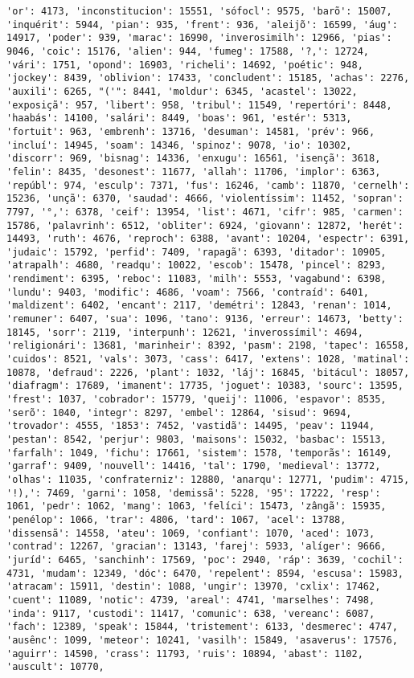 \documentclass[11pt]{article}
\begin{document}
\begin{Verbatim}[commandchars=\\\{\}]
'or': 4173, 'inconstitucion': 15551, 'sófocl': 9575, 'barõ': 15007, 'inquérit': 5944, 'pian': 935, 'frent': 936, 'aleijõ': 16599, 'áug': 14917, 'poder': 939, 'marac': 16990, 'inverosimilh': 12966, 'pias': 9046, 'coic': 15176, 'alien': 944, 'fumeg': 17588, '?,': 12724, 'vári': 1751, 'opond': 16903, 'richeli': 14692, 'poétic': 948, 'jockey': 8439, 'oblivion': 17433, 'concludent': 15185, 'achas': 2276, 'auxili': 6265, "('": 8441, 'moldur': 6345, 'acastel': 13022, 'exposiçã': 957, 'libert': 958, 'tribul': 11549, 'repertóri': 8448, 'haabás': 14100, 'salári': 8449, 'boas': 961, 'estér': 5313, 'fortuit': 963, 'embrenh': 13716, 'desuman': 14581, 'prév': 966, 'incluí': 14945, 'soam': 14346, 'spinoz': 9078, 'io': 10302, 'discorr': 969, 'bisnag': 14336, 'enxugu': 16561, 'isençã': 3618, 'felin': 8435, 'desonest': 11677, 'allah': 11706, 'implor': 6363, 'repúbl': 974, 'esculp': 7371, 'fus': 16246, 'camb': 11870, 'cernelh': 15236, 'unçã': 6370, 'saudad': 4666, 'violentíssim': 11452, 'sopran': 7797, '°,': 6378, 'ceif': 13954, 'list': 4671, 'cifr': 985, 'carmen': 15786, 'palavrinh': 6512, 'obliter': 6924, 'giovann': 12872, 'herét': 14493, 'ruth': 4676, 'reproch': 6388, 'avant': 10204, 'espectr': 6391, 'judaic': 15792, 'perfid': 7409, 'rapagã': 6393, 'ditador': 10905, 'atrapalh': 4680, 'readqu': 10022, 'escob': 15478, 'pincel': 8293, 'rendiment': 6395, 'reboc': 11083, 'milh': 5553, 'vagabund': 6398, 'lundu': 9403, 'modific': 4686, 'voam': 7566, 'contraíd': 6401, 'maldizent': 6402, 'encant': 2117, 'demétri': 12843, 'renan': 1014, 'remuner': 6407, 'sua': 1096, 'tano': 9136, 'erreur': 14673, 'betty': 18145, 'sorr': 2119, 'interpunh': 12621, 'inverossímil': 4694, 'religionári': 13681, 'marinheir': 8392, 'pasm': 2198, 'tapec': 16558, 'cuidos': 8521, 'vals': 3073, 'cass': 6417, 'extens': 1028, 'matinal': 10878, 'defraud': 2226, 'plant': 1032, 'láj': 16845, 'bitácul': 18057, 'diafragm': 17689, 'imanent': 17735, 'joguet': 10383, 'sourc': 13595, 'frest': 1037, 'cobrador': 15779, 'queij': 11006, 'espavor': 8535, 'serõ': 1040, 'integr': 8297, 'embel': 12864, 'sisud': 9694, 'trovador': 4555, '1853': 7452, 'vastidã': 14495, 'peav': 11944, 'pestan': 8542, 'perjur': 9803, 'maisons': 15032, 'basbac': 15513, 'farfalh': 1049, 'fichu': 17661, 'sistem': 1578, 'temporãs': 16149, 'garraf': 9409, 'nouvell': 14416, 'tal': 1790, 'medieval': 13772, 'olhas': 11035, 'confraterniz': 12880, 'anarqu': 12771, 'pudim': 4715, '!),': 7469, 'garni': 1058, 'demissã': 5228, '95': 17222, 'resp': 1061, 'pedr': 1062, 'mang': 1063, 'felíci': 15473, 'zângã': 15935, 'penélop': 1066, 'trar': 4806, 'tard': 1067, 'acel': 13788, 'dissensã': 14558, 'ateu': 1069, 'confiant': 1070, 'aced': 1073, 'contrad': 12267, 'gracian': 13143, 'farej': 5933, 'alíger': 9666, 'juríd': 6465, 'sanchinh': 17569, 'poc': 2940, 'ráp': 3639, 'cochil': 4731, 'mudam': 12349, 'dóc': 6470, 'repelent': 8594, 'escusa': 15983, 'atracam': 15911, 'destin': 1088, 'ungir': 13970, 'cxlix': 17462, 'cuent': 11089, 'notic': 4739, 'areal': 4741, 'marselhes': 7498, 'inda': 9117, 'custodi': 11417, 'comunic': 638, 'vereanc': 6087, 'fach': 12389, 'speak': 15844, 'tristement': 6133, 'desmerec': 4747, 'ausênc': 1099, 'meteor': 10241, 'vasilh': 15849, 'asaverus': 17576, 'aguirr': 14590, 'crass': 11793, 'ruis': 10894, 'abast': 1102, 'auscult': 10770, 
\end{Verbatim}
\end{document}
